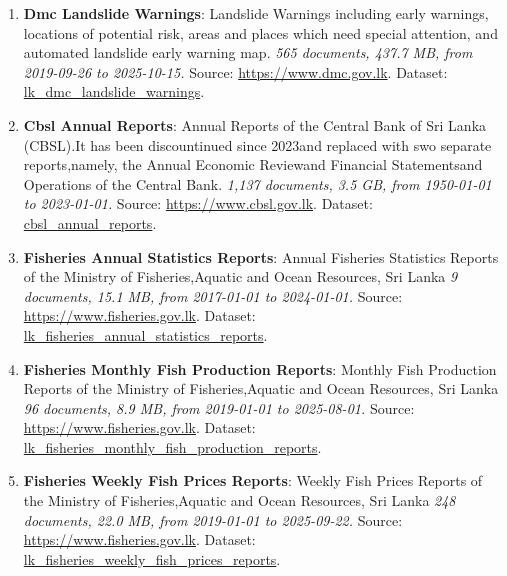 \documentclass[10pt,a4paper]{article}%
\begin{document}
\begin{enumerate}
\item%
\textbf{Dmc Landslide Warnings}: Landslide Warnings including early warnings, locations of potential risk, areas and places which need special attention, and automated landslide early warning map.\textit{ 565 documents, 437.7 MB, from 2019{-}09{-}26 to 2025{-}10{-}15.} Source: \href{https://www.dmc.gov.lk}{https://www.dmc.gov.lk}. Dataset: \href{https://github.com/nuuuwan/lk\_dmc/tree/data\_lk\_dmc\_landslide\_warnings/data/lk\_dmc\_landslide\_warnings}{lk\_dmc\_landslide\_warnings}.%
\item%
\textbf{Cbsl Annual Reports}: Annual Reports of the Central Bank of Sri Lanka (CBSL).It has been discountinued since 2023and replaced with swo separate reports,namely, the Annual Economic Reviewand Financial Statementsand Operations of the Central Bank.\textit{ 1,137 documents, 3.5 GB, from 1950{-}01{-}01 to 2023{-}01{-}01.} Source: \href{https://www.cbsl.gov.lk}{https://www.cbsl.gov.lk}. Dataset: \href{https://github.com/nuuuwan/cbsl/tree/data\_cbsl\_annual\_reports/data/cbsl\_annual\_reports}{cbsl\_annual\_reports}.%
\item%
\textbf{Fisheries Annual Statistics Reports}: Annual Fisheries Statistics Reports of the Ministry of Fisheries,Aquatic and Ocean Resources, Sri Lanka\textit{ 9 documents, 15.1 MB, from 2017{-}01{-}01 to 2024{-}01{-}01.} Source: \href{https://www.fisheries.gov.lk}{https://www.fisheries.gov.lk}. Dataset: \href{https://github.com/nuuuwan/lk\_fisheries/tree/data\_lk\_fisheries\_annual\_statistics\_reports/data/lk\_fisheries\_annual\_statistics\_reports}{lk\_fisheries\_annual\_statistics\_reports}.%
\item%
\textbf{Fisheries Monthly Fish Production Reports}: Monthly Fish Production Reports of the Ministry of Fisheries,Aquatic and Ocean Resources, Sri Lanka\textit{ 96 documents, 8.9 MB, from 2019{-}01{-}01 to 2025{-}08{-}01.} Source: \href{https://www.fisheries.gov.lk}{https://www.fisheries.gov.lk}. Dataset: \href{https://github.com/nuuuwan/lk\_fisheries/tree/data\_lk\_fisheries\_monthly\_fish\_production\_reports/data/lk\_fisheries\_monthly\_fish\_production\_reports}{lk\_fisheries\_monthly\_fish\_production\_reports}.%
\item%
\textbf{Fisheries Weekly Fish Prices Reports}: Weekly Fish Prices Reports of the Ministry of Fisheries,Aquatic and Ocean Resources, Sri Lanka\textit{ 248 documents, 22.0 MB, from 2019{-}01{-}01 to 2025{-}09{-}22.} Source: \href{https://www.fisheries.gov.lk}{https://www.fisheries.gov.lk}. Dataset: \href{https://github.com/nuuuwan/lk\_fisheries/tree/data\_lk\_fisheries\_weekly\_fish\_prices\_reports/data/lk\_fisheries\_weekly\_fish\_prices\_reports}{lk\_fisheries\_weekly\_fish\_prices\_reports}.%

\end{enumerate}
\end{document}
